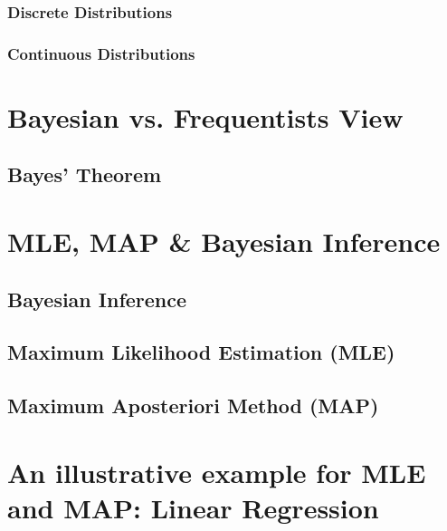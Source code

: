 \documentclass[letterpaper,10pt,english]{jupyterBook}
\begin{document}
\subsection{Discrete Distributions}
\label{\detokenize{fund/fundprob:discrete-distributions}}

\subsection{Continuous Distributions}
\label{\detokenize{fund/fundprob:continuous-distributions}}

\chapter{Bayesian vs. Frequentists View}
\label{\detokenize{fund/stat:bayesian-vs-frequentists-view}}\label{\detokenize{fund/stat::doc}}

\section{Bayes’ Theorem}
\label{\detokenize{fund/stat:bayes-theorem}}

\chapter{MLE, MAP \& Bayesian Inference}
\label{\detokenize{fund/bayes:mle-map-bayesian-inference}}\label{\detokenize{fund/bayes::doc}}

\section{Bayesian Inference}
\label{\detokenize{fund/bayes:bayesian-inference}}

\section{Maximum Likelihood Estimation (MLE)}
\label{\detokenize{fund/bayes:maximum-likelihood-estimation-mle}}

\section{Maximum A\sphinxhyphen{}posteriori Method (MAP)}
\label{\detokenize{fund/bayes:maximum-a-posteriori-method-map}}

\chapter{An illustrative example for MLE and MAP: Linear Regression}
\label{\detokenize{fund/linregr:an-illustrative-example-for-mle-and-map-linear-regression}}\label{\detokenize{fund/linregr::doc}}
\end{document}
